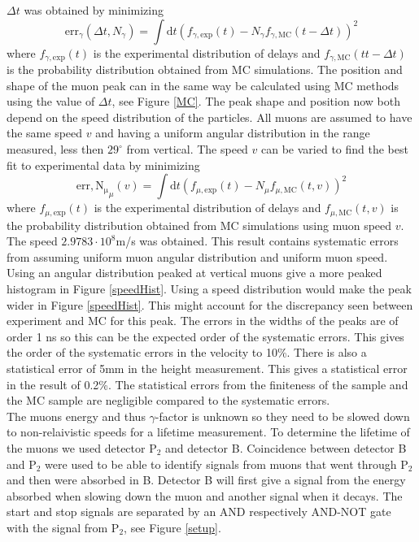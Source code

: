 \documentclass[10pt,twocolumn]{article}
\begin{document}
$\Delta t$ was obtained by minimizing
\begin{equation}
 \mathrm{err}_\gamma(\Delta t, N_\gamma)=\int\mathrm{d}t\left(f_{\gamma,\mathrm{exp}}(t)-N_\gamma f_{\gamma,\mathrm{MC}}(t-\Delta t)\right)^2
\end{equation}
where $f_{\gamma,\mathrm{exp}}(t)$ is the experimental distribution of delays and $f_{\gamma,\mathrm{MC}}(tt-\Delta t)$ is the probability distribution obtained from MC simulations. The position and shape of the muon peak can in the same way be calculated using MC methods using the value of $\Delta t$, see Figure \ref{MC}. The peak shape and position now both depend on the speed distribution of the particles. All muons are assumed to have the same speed $v$ and having a uniform angular distribution in the range measured, less then $29^\circ$ from vertical. The speed $v$ can be varied to find the best fit to experimental data by minimizing
\begin{equation}
 \mathrm{err,N_\mu}_\mu(v)=\int\mathrm{d}t\left(f_{\mu,\mathrm{exp}}(t)-N_\mu f_{\mu,\mathrm{MC}}(t,v)\right)^2
\end{equation}
where $f_{\mu,\mathrm{exp}}(t)$ is the experimental distribution of delays and $f_{\mu,\mathrm{MC}}(t,v)$ is the probability distribution obtained from MC simulations using muon speed $v$. The speed $2.9783\cdot10^8$m/s was obtained. This result contains systematic errors from assuming uniform muon angular distribution and uniform muon speed. Using an angular distribution peaked at vertical muons give a more peaked histogram in Figure \ref{speedHist}. Using a speed distribution would make the peak wider in Figure \ref{speedHist}. This might account for the discrepancy seen between experiment and MC for this peak. The errors in the widths of the peaks are of order 1 ns so this can be the expected order of the systematic errors. This gives the order of the systematic errors in the velocity to 10\%. There is also a statistical error of 5mm in the height measurement. This gives a statistical error in the result of 0.2\%. The statistical errors from the finiteness of the sample and the MC sample are negligible compared to the systematic errors.\\

The muons energy and thus $\gamma$-factor is unknown so they need to be slowed down to non-relaivistic speeds for a lifetime measurement. To determine the lifetime of the muons we used detector P$_2$ and detector B. Coincidence between detector B and P$_2$ were used to be able to identify signals from muons that went through P$_2$ and then were absorbed in B. Detector B will first give a signal from the energy absorbed when slowing down the muon and another signal when it decays. The start and stop signals are separated by an AND respectively AND-NOT gate with the signal from P$_2$, see Figure \ref{setup}.
\end{document}
